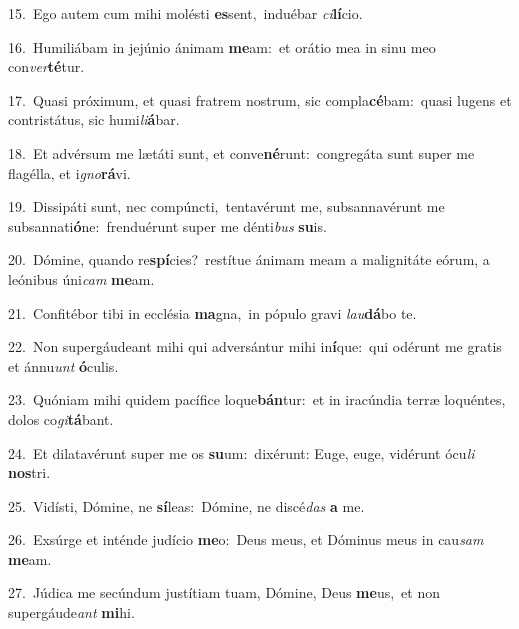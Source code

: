 {\numbfont\textcolor{\numbcolor}{15.}}~Ego autem cum mihi molésti \textbf{es}\-sent,~\star induébar \textit{ci}\-\textbf{lí}cio.\par
{\numbfont\textcolor{\numbcolor}{16.}}~Humiliábam in jejúnio ánimam \textbf{me}\-am:~\star et orátio mea in sinu meo con\-\textit{ver}\-\textbf{té}tur.\par
{\numbfont\textcolor{\numbcolor}{17.}}~Quasi próximum, et quasi fratrem nostrum, sic compla\-\textbf{cé}\-bam:~\star quasi lugens et contristátus, sic humi\-\textit{li}\-\textbf{á}bar.\par
{\numbfont\textcolor{\numbcolor}{18.}}~Et advérsum me lætáti sunt, et conve\-\textbf{né}\-runt:~\star congregáta sunt super me flagélla, et i\-\textit{gno}\-\textbf{rá}vi.\par
{\numbfont\textcolor{\numbcolor}{19.}}~Dissipáti sunt, nec compúncti,~\dagger tentavérunt me, subsannavérunt me subsannati\-\textbf{ó}\-ne:~\star frenduérunt super me dénti\textit{bus} \textbf{su}\-is.\par
{\numbfont\textcolor{\numbcolor}{20.}}~Dómine, quando re\-\textbf{spí}\-cies?~\star restítue ánimam meam a malignitáte eórum, a leónibus úni\textit{cam} \textbf{me}\-am.\par
{\numbfont\textcolor{\numbcolor}{21.}}~Confitébor tibi in ecclésia \textbf{ma}\-gna,~\star in pópulo gravi \textit{lau}\-\textbf{dá}bo te.\par
{\numbfont\textcolor{\numbcolor}{22.}}~Non supergáudeant mihi qui adversántur mihi in\-\textbf{í}\-que:~\star qui odérunt me gratis et ánnu\textit{unt} \textbf{ó}\-culis.\par
{\numbfont\textcolor{\numbcolor}{23.}}~Quóniam mihi quidem pacífice loque\-\textbf{bán}\-tur:~\star et in iracúndia terræ loquéntes, dolos co\-\textit{gi}\-\textbf{tá}bant.\par
{\numbfont\textcolor{\numbcolor}{24.}}~Et dilatavérunt super me os \textbf{su}\-um:~\star dixérunt: Euge, euge, vidérunt ócu\textit{li} \textbf{nos}\-tri.\par
{\numbfont\textcolor{\numbcolor}{25.}}~Vidísti, Dómine, ne \textbf{sí}\-leas:~\star Dómine, ne discé\textit{das} \textbf{a} me.\par
{\numbfont\textcolor{\numbcolor}{26.}}~Exsúrge et inténde judício \textbf{me}\-o:~\star Deus meus, et Dóminus meus in cau\textit{sam} \textbf{me}\-am.\par
{\numbfont\textcolor{\numbcolor}{27.}}~Júdica me secúndum justítiam tuam, Dómine, Deus \textbf{me}\-us,~\star et non supergáude\textit{ant} \textbf{mi}\-hi.\par
